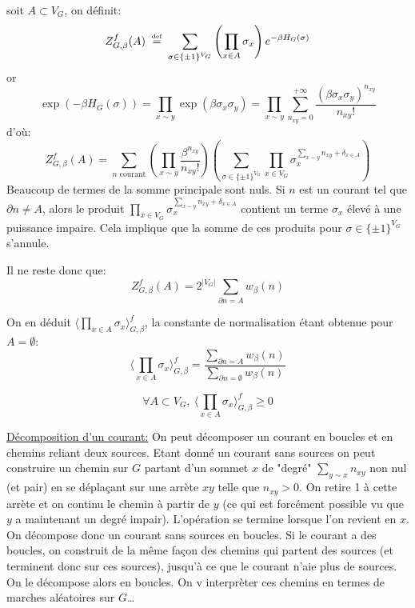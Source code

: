 \documentclass[a4paper,12pt]{report}
\newcommand\eqdef{\mathrel{\stackrel{\makebox[0pt]{\mbox{\normalfont\tiny def}}}{=}}}
\begin{document}
soit $A \subset V_G$, on définit:
$$
Z_{G,\beta}^f(A) \ \eqdef \ \sum_{\sigma \in \{ \pm 1 \}^{V_G} } \left( \prod_{x \in A} \sigma_x \right) e^{- \beta H_G(\sigma)}
$$
or
$$
\exp(-\beta H_G(\sigma)) = \prod_{x \sim y} \exp(\beta \sigma_x \sigma_y) = \prod_{x \sim y} \sum_{n_{xy}=0}^{+ \infty} \frac{(\beta \sigma_x \sigma_y)^{n_{xy}}}{n_{xy}!}
$$
d'où:
$$
Z_{G,\beta}^f(A) = \sum_{n \text{ courant}} \left( \prod_{x \sim y} \frac{\beta^{n_{xy}}}{n_{xy}!} \right) \left( \sum_{\sigma \in \{ \pm 1 \}^{V_G}} \prod_{x \in V_G} \sigma_x^{\sum_{x \sim y} n_{xy} + \delta_{x \in A}} \right)
$$
Beaucoup de termes de la somme principale sont nuls. Si $n$ est un courant tel que $\partial n \neq A$, alors le produit $\prod_{x \in V_G} \sigma_x^{\sum_{x \sim y} n_{xy} + \delta_{x \in A}}$ contient un terme $\sigma_x$ élevé à une puissance impaire. Cela implique que la somme de ces produits pour $\sigma \in \{ \pm 1 \}^{V_G}$ s'annule.
\newline

Il ne reste donc que:
$$
Z_{G,\beta}^f(A) = 2^{\vert V_G \vert} \sum_{\partial n  = A} w_{\beta}(n)
$$

On en déduit $\langle \prod_{x \in A} \sigma_x \rangle_{G,\beta}^f$, la constante de normalisation étant obtenue pour $A = \emptyset$:
$$
\langle \prod_{x \in A} \sigma_x \rangle_{G,\beta}^f = \frac{\sum_{\partial n = A} w_{\beta}(n)}{\sum_{\partial n = \emptyset} w_{\beta}(n)}
$$

\begin{prop}
$$
\forall A \subset V_G, \ \langle \prod_{x \in A} \sigma_x \rangle_{G,\beta}^f \geq 0
$$
\end{prop}

\underline{Décomposition d'un courant:} On peut décomposer un courant en boucles et en chemins reliant deux sources. Etant donné un courant sans sources on peut construire un chemin sur $G$ partant d'un sommet $x$ de "degré" $\sum_{y \sim x} n_{xy}$ non nul (et pair) en se déplaçant sur une arrète $xy$ telle que $n_{xy}>0$. On retire 1 à cette arrète et on continu le chemin à partir de $y$ (ce qui est forcément possible vu que $y$ a maintenant un degré impair). L'opération se termine lorsque l'on revient en $x$. On décompose donc un courant sans sources en boucles. Si le courant a des boucles, on construit de la même façon des chemins qui partent des sources (et terminent donc sur ces sources), jusqu'à ce que le courant n'aie plus de sources. On le décompose alors en boucles. On v interprèter ces chemins en termes de marches aléatoires sur $G$\dots
\end{document}
